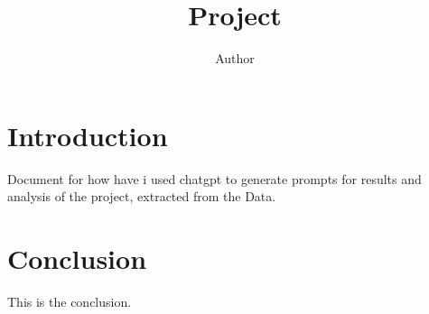\documentclass{article}
\begin{document}
\title{Project}
\author{Author}
\maketitle

\section{Introduction}
\label{sec:intro}
Document for how have i used chatgpt to generate prompts for results and analysis of the project, extracted from the Data.\\


\section{}


\section{Conclusion}
\label{sec:conclusion}
This is the conclusion.
\end{document}
